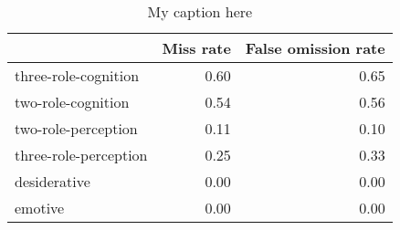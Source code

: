 \begin{table}[!ht]
\centering
\begin{tabular}{lrr}
\toprule
{} &  Miss rate &  False omission rate \\
\midrule
three-role-cognition  &       0.60 &                 0.65 \\
two-role-cognition    &       0.54 &                 0.56 \\
two-role-perception   &       0.11 &                 0.10 \\
three-role-perception &       0.25 &                 0.33 \\
desiderative          &       0.00 &                 0.00 \\
emotive               &       0.00 &                 0.00 \\
\bottomrule
\end{tabular}
\caption{My caption here}
\label{tab:MENTAL-oe-combined-errors}
\end{table}